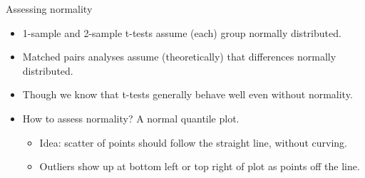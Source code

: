 \documentclass[ignorenonframetext,]{beamer}
\providecommand{\tightlist}{%
  \setlength{\itemsep}{0pt}\setlength{\parskip}{0pt}}
\begin{document}
\begin{frame}{Assessing normality}
\protect\hypertarget{assessing-normality}{}

\begin{itemize}
\tightlist
\item
  1-sample and 2-sample t-tests assume (each) group normally
  distributed.
\item
  Matched pairs analyses assume (theoretically) that differences
  normally distributed.
\item
  Though we know that t-tests generally behave well even without
  normality.
\item
  How to assess normality? A normal quantile plot.

  \begin{itemize}
  \tightlist
  \item
    Idea: scatter of points should follow the straight line, without
    curving.
  \item
    Outliers show up at bottom left or top right of plot as points off
    the line.
  \end{itemize}
\end{itemize}

\end{frame}
\end{document}
